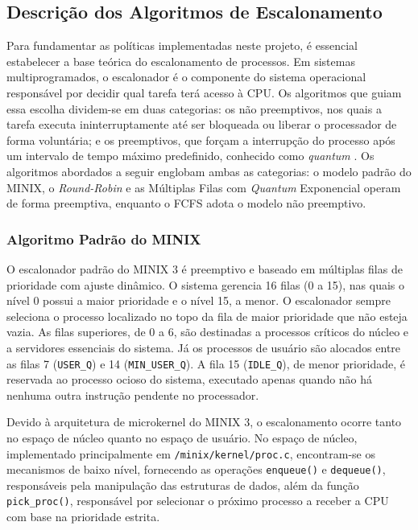 \documentclass[12pt]{article}
\begin{document}
\subsection{Descrição dos Algoritmos de Escalonamento}

Para fundamentar as políticas implementadas neste projeto, é essencial estabelecer a base teórica do escalonamento de processos. Em sistemas multiprogramados, o escalonador é o componente do sistema operacional responsável por decidir qual tarefa terá acesso à CPU. Os algoritmos que guiam essa escolha dividem-se em duas categorias: os não preemptivos, nos quais a tarefa executa ininterruptamente até ser bloqueada ou liberar o processador de forma voluntária; e os preemptivos, que forçam a interrupção do processo após um intervalo de tempo máximo predefinido, conhecido como \textit{quantum} \cite[p. 103--106]{tanenbaum}. Os algoritmos abordados a seguir englobam ambas as categorias: o modelo padrão do MINIX, o \textit{Round-Robin} e as Múltiplas Filas com \textit{Quantum} Exponencial operam de forma preemptiva, enquanto o FCFS adota o modelo não preemptivo.
\vspace{-10pt}
\subsubsection{Algoritmo Padrão do MINIX}
\vspace{-10pt}
O escalonador padrão do MINIX 3 é preemptivo e baseado em múltiplas filas de prioridade com ajuste dinâmico. O sistema gerencia 16 filas (0 a 15), nas quais o nível 0 possui a maior prioridade e o nível 15, a menor. O escalonador sempre seleciona o processo localizado no topo da fila de maior prioridade que não esteja vazia. As filas superiores, de 0 a 6, são destinadas a processos críticos do núcleo e a servidores essenciais do sistema. Já os processos de usuário são alocados entre as filas 7 (\texttt{USER\_Q}) e 14 (\texttt{MIN\_USER\_Q}). A fila 15 (\texttt{IDLE\_Q}), de menor prioridade, é reservada ao processo ocioso do sistema, executado apenas quando não há nenhuma outra instrução pendente no processador.

Devido à arquitetura de microkernel do MINIX 3, o escalonamento ocorre tanto no espaço de núcleo quanto no espaço de usuário. No espaço de núcleo, implementado principalmente em \texttt{/minix/kernel/proc.c}, encontram-se os mecanismos de baixo nível, fornecendo as operações \texttt{enqueue()} e \texttt{dequeue()}, responsáveis pela manipulação das estruturas de dados, além da função \texttt{pick\_proc()}, responsável por selecionar o próximo processo a receber a CPU com base na prioridade estrita.
\end{document}
